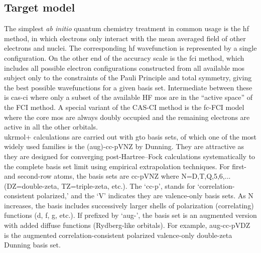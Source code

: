 \subsection{Target model}

The simplest \textit{ab initio} quantum chemistry
treatment in common usage is the \ac{hf} method,
in which electrons only interact with the mean averaged field
of other electrons and nuclei. The corresponding \ac{hf} wavefunction
is represented by a single configuration. On the other
end of the accuracy scale is the \ac{fci}
method, which includes all possible electron configurations
constructed from all available \acp{mo}
subject only to the constraints of the Pauli Principle and total
symmetry, giving the best possible wavefunctions for a given
basis set. Intermediate between these is
\ac{cas}-\ac{ci} where only
a subset of the available HF \acp{mo} are in the ``active space'' 
of the FCI method. A
special variant of the CAS-CI method is the \ac{fc}-FCI
model where the core \acp{mo} are always
doubly occupied and the remaining electrons are active in all
the other orbitals. \\

\ac{ukrmol+} calculations are carried out with \ac{gto} 
basis sets, of which one of the most widely used families
is the (aug)-cc-pVNZ by Dunning.\cite{dunning1989} They are attractive as they are designed for 
converging post-Hartree–Fock calculations systematically to the complete basis set limit using empirical extrapolation techniques.
For first- and second-row atoms, the basis sets are cc-pVNZ where N=D,T,Q,5,6,... (DZ=double-zeta, TZ=triple-zeta, etc.). 
The `cc-p', stands for `correlation-consistent polarized,' and the `V' indicates they are valence-only basis sets. 
As N increases, the basis includes successively larger shells of polarization (correlating) functions (d, f, g, etc.). 
If prefixed by `aug-', the basis set is an augmented version with added diffuse functions (Rydberg-like orbitals).
For example, aug-cc-pVDZ is the augmented correlation-consistent polarized valence-only double-zeta Dunning basis set.\\

